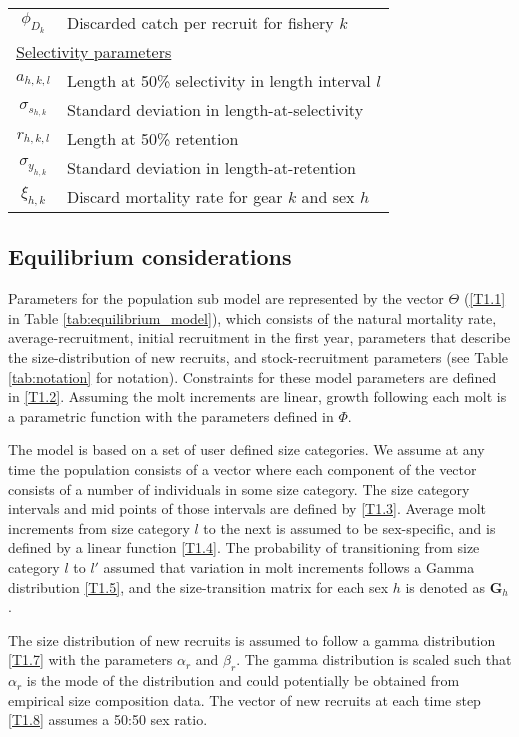 \documentclass[12pt,letterpaper]{article}
\begin{document}
\begin{table}
\begin{tabular}{cl}
      $\phi_{D_k}$& Discarded catch per recruit for fishery $k$ \\
  \multicolumn{2}{l}{\underline{Selectivity parameters}} \\
      $a_{h,k,l}$ & Length at 50\% selectivity in length interval $l$\\
      $\sigma_{s_{h,k}}$ & Standard deviation in length-at-selectivity\\
      $r_{h,k,l}$ & Length at 50\% retention\\
      $\sigma_{y_{h,k}}$ & Standard deviation in length-at-retention\\
      $\xi_{h,k}$ & Discard mortality rate for gear $k$ and sex $h$\\
  \hline
  \end{tabular}
\end{table}


    \subsection*{Equilibrium considerations} %
    \label{sub:equilibrium_considerations}
    Parameters for the population sub model are represented by the vector $\Theta$ (\ref{T1.1} in Table \ref{tab:equilibrium_model}), which consists of the natural mortality rate, average-recruitment, initial recruitment in the first year, parameters that describe the size-distribution of new recruits, and stock-recruitment parameters (see Table \ref{tab:notation} for notation).  Constraints for these model parameters are defined in \eqref{T1.2}.  Assuming the molt increments are linear, growth following each molt is a parametric function with the parameters defined in $\Phi$.

    The model is based on a set of user defined size categories. We assume at any time the population consists of a vector where each component of the vector consists of a number of individuals in some size category. The size category intervals and mid points of those intervals are defined by \eqref{T1.3}.  Average molt increments from size category $l$ to the next is assumed to be sex-specific, and is defined by a linear function \eqref{T1.4}.  The probability of transitioning from  size category $l$ to $l'$ assumed that variation in molt increments follows a Gamma distribution \eqref{T1.5}, and the size-transition matrix for each sex $h$ is denoted as $\pmb{G}_h$.

    The size distribution of new recruits is assumed to follow a gamma distribution \eqref{T1.7} with the parameters $\alpha_r$ and $\beta_r$.  The gamma distribution is scaled such that $\alpha_r$ is the mode of the distribution and could potentially be obtained from empirical size composition data.  The vector of new recruits at each time step \eqref{T1.8} assumes a 50:50 sex ratio.
\end{document}
